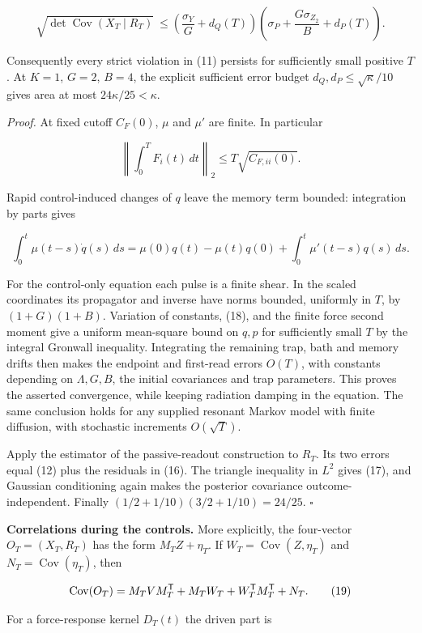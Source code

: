 \documentclass[11pt,a4paper]{article}
\begin{document}
\[\boxed{\sqrt{\det\operatorname{Cov}(X_T\mid R_T)}}
\ \le\left(\frac{\sigma_Y}{G}+d_Q(T)\right)
\left(\sigma_P+\frac{G\sigma_{Z_2}}B+d_P(T)\right). \tag{17}\]

Consequently every strict violation in (11) persists for sufficiently
small positive \(T\). At \(K=1\), \(G=2\), \(B=4\), the explicit
sufficient error budget \(d_Q,d_P\le\sqrt\kappa/10\) gives area at most
\(24\kappa/25<\kappa\).

\emph{Proof.} At fixed cutoff \(C_F(0)\), \(\mu\) and \(\mu'\) are
finite. In particular

\[\left\|\int_0^T F_i(t)\,dt\right\|_2
 \le T\sqrt{C_{F,ii}(0)}.\]

Rapid control-induced changes of \(q\) leave the memory term bounded:
integration by parts gives

\[\int_0^t\mu(t-s)\dot q(s)\,ds
 =\mu(0)q(t)-\mu(t)q(0)
       +\int_0^t\mu'(t-s)q(s)\,ds. \tag{18}\]

For the control-only equation each pulse is a finite shear. In the
scaled coordinates its propagator and inverse have norms bounded,
uniformly in \(T\), by \((1+G)(1+B)\). Variation of constants, (18), and
the finite force second moment give a uniform mean-square bound on
\(q,p\) for sufficiently small \(T\) by the integral Gronwall
inequality. Integrating the remaining trap, bath and memory drifts then
makes the endpoint and first-read errors \(O(T)\), with constants
depending on \(\Lambda,G,B\), the initial covariances and trap
parameters. This proves the asserted convergence, while keeping
radiation damping in the equation. The same conclusion holds for any
supplied resonant Markov model with finite diffusion, with stochastic
increments \(O(\sqrt T)\).

Apply the estimator of the passive-readout construction to \(R_T\). Its
two errors equal (12) plus the residuals in (16). The triangle
inequality in \(L^2\) gives (17), and Gaussian conditioning again makes
the posterior covariance outcome-independent. Finally
\((1/2+1/10)(3/2+1/10)=24/25\). \(\square\)

\textbf{Correlations during the controls.} More explicitly, the
four-vector \(O_T=(X_T,R_T)\) has the form \(M_T Z+\eta_T\). If
\(W_T=\operatorname{Cov}(Z,\eta_T)\) and
\(N_T=\operatorname{Cov}(\eta_T)\), then

\[\operatorname{Cov}(O_T)=M_TVM_T^{\sf T}
 +M_TW_T+W_T^{\sf T}M_T^{\sf T}+N_T. \tag{19}\]

For a force-response kernel \(D_T(t)\) the driven part is
\end{document}
